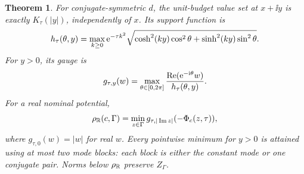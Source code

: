 \documentclass[11pt]{article}
\newtheorem{theorem}{Theorem}\newtheorem{proposition}[theorem]{Proposition}\newtheorem{corollary}[theorem]{Corollary}\newtheorem{lemma}[theorem]{Lemma}
\begin{document}
\begin{theorem}\label{thm:real}
For conjugate-symmetric $d$, the unit-budget value set at $x+\ii y$ is exactly $K_\tau(|y|)$, independently of $x$. Its support function is
\begin{equation}\label{eq:h}
 h_\tau(\theta,y)=\max_{k\ge0}\mathrm e^{-\tau k^2}
 \sqrt{\cosh^2(ky)\cos^2\theta+\sinh^2(ky)\sin^2\theta}.
\end{equation}
For $y>0$, its gauge is
\begin{equation}\label{eq:gauge}
 g_{\tau,y}(w)=\max_{\theta\in[0,2\pi]}
 \frac{\operatorname{Re}(\mathrm e^{-\mathrm i\theta}w)}{h_\tau(\theta,y)}.
\end{equation}
For a real nominal potential,
\begin{equation}\label{eq:realradius}
 \rho_\mathbb R(c,\Gamma)=\min_{z\in\Gamma}g_{\tau,|\operatorname{Im} z|}(-\Phi_c(z,\tau)),
\end{equation}
where $g_{\tau,0}(w)=|w|$ for real $w$. Every pointwise minimum for $y>0$ is attained using at most two mode blocks: each block is either the constant mode or one conjugate pair. Norms below $\rho_\mathbb R$ preserve $Z_\Gamma$.
\end{theorem}
\end{document}
